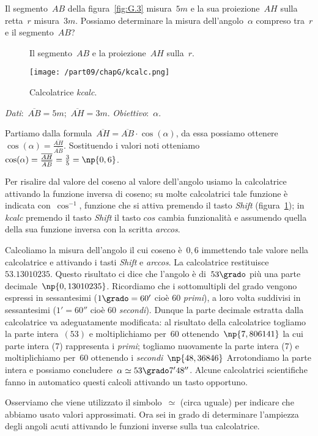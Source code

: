 \begin{problema}
Il segmento~${AB}$ della figura~\ref{fig:G.3} misura~$5\unit{m}$ e la sua proiezione~${AH}$ sulla retta~$r$ misura~$3\unit{m}$.
Possiamo determinare la misura dell'angolo~${\alpha}$ compreso tra~$r$ e il segmento~${AB}$?

\end{problema}
\begin{figure}[t]
\begin{minipage}[t]{.45\textwidth}
 \centering
 
  \caption{Il segmento~$AB$ e la proiezione~${AH}$ sulla~$r$.}\label{fig:G.3}
\end{minipage}\hfil
\begin{minipage}[t]{.45\textwidth}
 \centering
\texttt{[image: /part09/chapG/kcalc.png]}
 \caption{Calcolatrice \emph{kcalc}.}\label{fig:G.4}
\end{minipage}
\end{figure}

\emph{Dati}:~$\overline{AB}=5\unit{m}$;\quad~$\overline{AH}=3\unit{m}$. \qquad\emph{Obiettivo}:~$\alpha$.

\begin{soluzione}
 Partiamo dalla formula~$\overline{AH}=\overline{AB}\cdot \cos(\alpha)$, da essa possiamo ottenere
$\cos(\alpha)=\frac{\overline{AH}}{\overline{AB}}$. Sostituendo i valori noti otteniamo
$\cos(\alpha)=\frac{\overline{AH}}{\overline{AB}}=\frac{3}{5}=\np{0,6}$.

Per risalire dal valore del coseno al valore dell'angolo usiamo la calcolatrice attivando la funzione inversa di coseno; su molte calcolatrici
tale funzione è indicata con~$\cos^{-1}$, funzione che si attiva premendo il tasto \emph{Shift} (figura~\ref{fig:G.4}); in \emph{kcalc}
premendo il tasto \emph{Shift} il tasto $cos$ cambia funzionalità e assumendo quella della sua funzione inversa con la scritta \emph{arccos}.

Calcoliamo la misura dell'angolo il cui coseno è~$0,6$ immettendo tale valore nella calcolatrice e attivando i tasti \emph{Shift} e \emph{arccos}.
La calcolatrice restituisce~$53.13010235$.
Questo risultato ci dice che l'angolo è di~$53\grado$ più una parte decimale~$\np{0,13010235}$.
Ricordiamo che i sottomultipli del grado vengono espressi in sessantesimi ($1\grado=60'$ cioè 60 \emph{primi}),
a loro volta suddivisi in sessantesimi ($1'=60''$ cioè 60 \emph{secondi}).
Dunque la parte decimale estratta dalla calcolatrice va adeguatamente modificata:
al risultato della calcolatrice togliamo la parte intera~$(53)$ e moltiplichiamo per~$60$ ottenendo~$\np{7,806141}$ la cui parte
intera (7) rappresenta i \emph{primi}; togliamo nuovamente la parte intera (7) e moltiplichiamo per~$60$ ottenendo i \emph{secondi}~$\np{48,36846}$
Arrotondiamo la parte intera e possiamo concludere~$\alpha\simeq 53\grado 7'48''$.
Alcune calcolatrici scientifiche fanno in automatico questi calcoli attivando un tasto opportuno.

Osserviamo che viene utilizzato il simbolo~$\simeq$ (circa uguale) per indicare che abbiamo usato valori approssimati.
Ora sei in grado di determinare l'ampiezza degli angoli acuti attivando le funzioni inverse sulla tua calcolatrice.
\end{soluzione}

